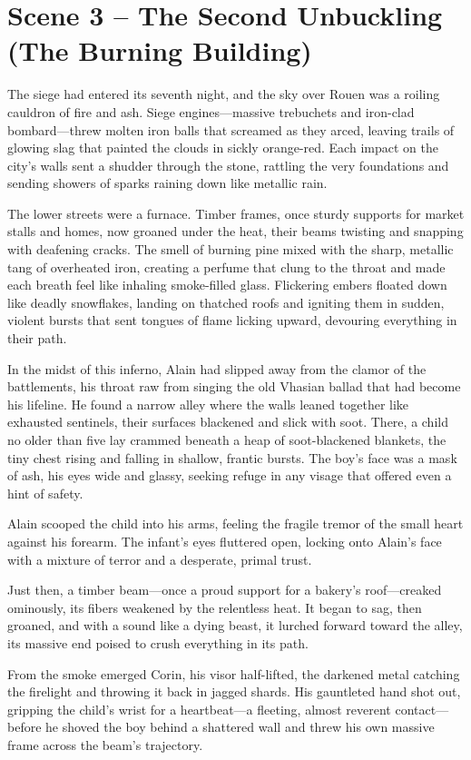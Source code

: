 \documentclass[11pt,twoside]{book}
\begin{document}
\section{Scene 3 -- The Second Unbuckling (The Burning Building)}
The siege had entered its seventh night, and the sky over Rouen was a roiling cauldron of fire and ash.  Siege engines---massive trebuchets and iron-clad bombard---threw molten iron balls that screamed as they arced, leaving trails of glowing slag that painted the clouds in sickly orange-red.  Each impact on the city's walls sent a shudder through the stone, rattling the very foundations and sending showers of sparks raining down like metallic rain.

The lower streets were a furnace.  Timber frames, once sturdy supports for market stalls and homes, now groaned under the heat, their beams twisting and snapping with deafening cracks.  The smell of burning pine mixed with the sharp, metallic tang of overheated iron, creating a perfume that clung to the throat and made each breath feel like inhaling smoke-filled glass.  Flickering embers floated down like deadly snowflakes, landing on thatched roofs and igniting them in sudden, violent bursts that sent tongues of flame licking upward, devouring everything in their path.

In the midst of this inferno, Alain had slipped away from the clamor of the battlements, his throat raw from singing the old Vhasian ballad that had become his lifeline.  He found a narrow alley where the walls leaned together like exhausted sentinels, their surfaces blackened and slick with soot.  There, a child no older than five lay crammed beneath a heap of soot-blackened blankets, the tiny chest rising and falling in shallow, frantic bursts.  The boy's face was a mask of ash, his eyes wide and glassy, seeking refuge in any visage that offered even a hint of safety.

Alain scooped the child into his arms, feeling the fragile tremor of the small heart against his forearm.  The infant's eyes fluttered open, locking onto Alain's face with a mixture of terror and a desperate, primal trust.

Just then, a timber beam---once a proud support for a bakery's roof---creaked ominously, its fibers weakened by the relentless heat.  It began to sag, then groaned, and with a sound like a dying beast, it lurched forward toward the alley, its massive end poised to crush everything in its path.

From the smoke emerged Corin, his visor half-lifted, the darkened metal catching the firelight and throwing it back in jagged shards.  His gauntleted hand shot out, gripping the child's wrist for a heartbeat---a fleeting, almost reverent contact---before he shoved the boy behind a shattered wall and threw his own massive frame across the beam's trajectory.
\end{document}
